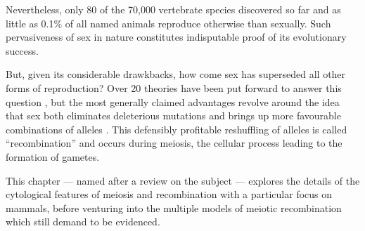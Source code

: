 Nevertheless, only 80 \citep{vrijenhoek1989list,neaves2011unisexual} of the 70,000 vertebrate species discovered so far \citep{iucn2019} and as little as 0.1\% of all named animals \citep{vrijenhoek1998animal} reproduce otherwise than sexually. %
Such pervasiveness of sex in nature constitutes indisputable proof of its evolutionary success. 

But, given its considerable drawkbacks, how come sex has superseded all other forms of reproduction?
Over 20 theories have been put forward to answer this question \citep{kondrashov1993classification}, but the most generally claimed advantages revolve around the idea that sex both eliminates deleterious mutations and brings up more favourable combinations of alleles \citep{normarck2003genomic, speijer2016can}.
This defensibly profitable reshuffling of alleles is called “recombination” and occurs during meiosis, the cellular process leading to the formation of gametes.

This chapter — named after a review on the subject \citep{hunter2015meiotic} — explores the details of the cytological features of meiosis and recombination with a particular focus on mammals, before venturing into the multiple models of meiotic recombination which still demand to be evidenced.




